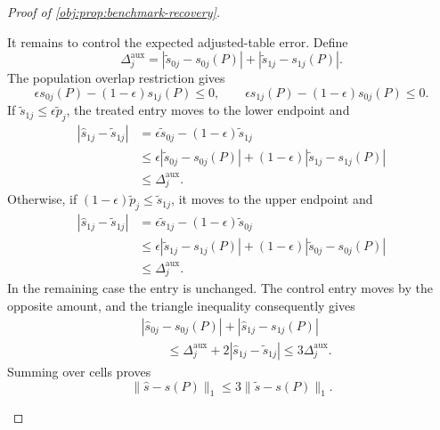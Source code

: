 \documentclass[11pt]{article}
\begin{document}
\begin{proof}[Proof of \cref{obj:prop:benchmark-recovery}]
\begin{enumerate}
It remains to control the expected adjusted-table error. Define
\[
\Delta_j^{\mathrm{aux}}
=
|\widetilde s_{0j}-s_{0j}(P)|
+|\widetilde s_{1j}-s_{1j}(P)|.
\]
The population overlap restriction gives
\[
\epsilon s_{0j}(P)-(1-\epsilon)s_{1j}(P)\le0,
\qquad
\epsilon s_{1j}(P)-(1-\epsilon)s_{0j}(P)\le0.
\]
If \(\widetilde s_{1j}\le\epsilon\widetilde p_j\), the treated entry moves to the lower endpoint and
\[
\begin{aligned}
|\widehat s_{1j}-\widetilde s_{1j}|
&=\epsilon\widetilde s_{0j}-(1-\epsilon)\widetilde s_{1j}\\
&\le
\epsilon|\widetilde s_{0j}-s_{0j}(P)|
+(1-\epsilon)|\widetilde s_{1j}-s_{1j}(P)|\\
&\le\Delta_j^{\mathrm{aux}}.
\end{aligned}
\]
Otherwise, if \((1-\epsilon)\widetilde p_j\le\widetilde s_{1j}\), it moves to the upper endpoint and
\[
\begin{aligned}
|\widehat s_{1j}-\widetilde s_{1j}|
&=\epsilon\widetilde s_{1j}-(1-\epsilon)\widetilde s_{0j}\\
&\le
\epsilon|\widetilde s_{1j}-s_{1j}(P)|
+(1-\epsilon)|\widetilde s_{0j}-s_{0j}(P)|\\
&\le\Delta_j^{\mathrm{aux}}.
\end{aligned}
\]
In the remaining case the entry is unchanged. The control entry moves by the opposite amount, and the triangle inequality consequently gives
\[
\begin{aligned}
&|\widehat s_{0j}-s_{0j}(P)|
+|\widehat s_{1j}-s_{1j}(P)|\\
&\qquad\le
\Delta_j^{\mathrm{aux}}
+2|\widehat s_{1j}-\widetilde s_{1j}|
\le3\Delta_j^{\mathrm{aux}}.
\end{aligned}
\]
Summing over cells proves
\[
\|\widehat s-s(P)\|_1
\le3\|\widetilde s-s(P)\|_1.
\]


\end{enumerate}
\end{proof}
\end{document}
